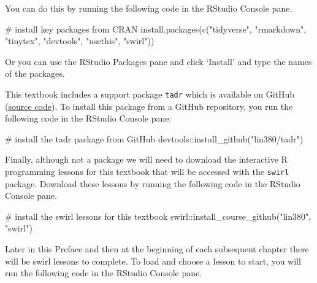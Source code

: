 \documentclass[
  letterpaper,
]{latex/krantz}
\newenvironment{Shaded}{\begin{snugshade}}{\end{snugshade}}
\newcommand{\CommentTok}[1]{\textcolor[rgb]{0.37,0.37,0.37}{#1}}
\newcommand{\FunctionTok}[1]{\textcolor[rgb]{0.28,0.35,0.67}{#1}}
\newcommand{\NormalTok}[1]{\textcolor[rgb]{0.00,0.23,0.31}{#1}}
\newcommand{\SpecialCharTok}[1]{\textcolor[rgb]{0.37,0.37,0.37}{#1}}
\newcommand{\StringTok}[1]{\textcolor[rgb]{0.13,0.47,0.30}{#1}}
\begin{document}
You can do this by running the following code in the RStudio Console
pane.

\begin{Shaded}
\begin{Highlighting}[]
 \CommentTok{\# install key packages from CRAN}
\FunctionTok{install.packages}\NormalTok{(}\FunctionTok{c}\NormalTok{(}\StringTok{"tidyverse"}\NormalTok{, }\StringTok{"rmarkdown"}\NormalTok{, }\StringTok{"tinytex"}\NormalTok{, }\StringTok{"devtools"}\NormalTok{, }\StringTok{"usethis"}\NormalTok{, }\StringTok{"swirl"}\NormalTok{))}
\end{Highlighting}
\end{Shaded}

Or you can use the RStudio Packages pane and click `Install' and type
the names of the packages.

This textbook includes a support package \texttt{tadr} which is
available on GitHub (\href{https://github.com/lin380/tadr}{source
code}). To install this package from a GitHub repository, you run the
following code in the RStudio Console pane:

\begin{Shaded}
\begin{Highlighting}[]
\CommentTok{\# install the tadr package from GitHub}
\NormalTok{devtools}\SpecialCharTok{::}\FunctionTok{install\_github}\NormalTok{(}\StringTok{"lin380/tadr"}\NormalTok{) }
\end{Highlighting}
\end{Shaded}

Finally, although not a package we will need to download the interactive
R programming lessons for this textbook that will be accessed with the
\texttt{swirl} package. Download these lessons by running the following
code in the RStudio Console pane.

\begin{Shaded}
\begin{Highlighting}[]
\CommentTok{\# install the swirl lessons for this textbook}
\NormalTok{swirl}\SpecialCharTok{::}\FunctionTok{install\_course\_github}\NormalTok{(}\StringTok{"lin380"}\NormalTok{, }\StringTok{"swirl"}\NormalTok{)}
\end{Highlighting}
\end{Shaded}

Later in this Preface and then at the beginning of each subsequent
chapter there will be swirl lessons to complete. To load and choose a
lesson to start, you will run the following code in the RStudio Console
pane.
\end{document}
